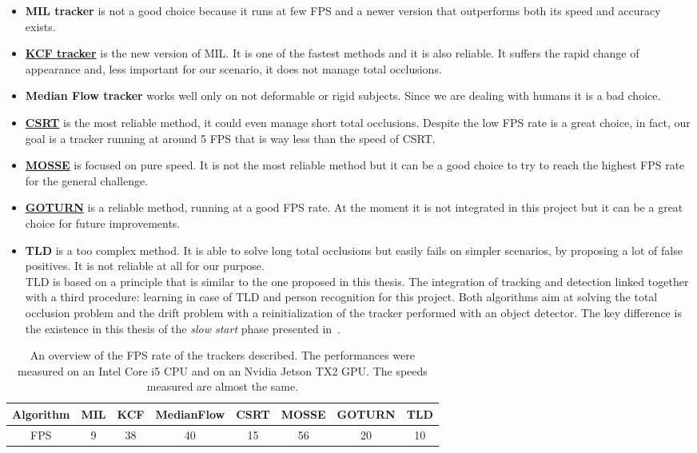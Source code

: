 \begin{itemize}
	\item \textbf{MIL tracker} is not a good choice because it runs at few FPS and a newer version that outperforms both its speed and accuracy exists.
	\item \underline{\textbf{KCF tracker}} is the new version of MIL. It is one of the fastest methods and it is also reliable. It suffers the rapid change of appearance and, less important for our scenario, it does not manage total occlusions.
	\item \textbf{Median Flow tracker} works well only on not deformable or rigid subjects. Since we are dealing with humans it is a bad choice.
	\item \underline{\textbf{CSRT}} is the most reliable method, it could even manage short total occlusions. Despite the low FPS rate is a great choice, in fact, our goal is a tracker running at around 5 FPS that is way less than the speed of CSRT.
	\item \underline{\textbf{MOSSE}} is focused on pure speed. It is not the most reliable method but it can be a good choice to try to reach the highest FPS rate for the general challenge.
	\item \underline{\textbf{GOTURN}} is a reliable method, running at a good FPS rate. At the moment it is not integrated in this project but it can be a great choice for future improvements.
	\item \textbf{TLD} is a too complex method. It is able to solve long total occlusions but easily fails on simpler scenarios, by proposing a lot of false positives. It is not reliable at all for our purpose.\\
	TLD is based on a principle that is similar to the one proposed in this thesis. The integration of tracking and detection linked together with a third procedure: learning in case of TLD and person recognition for this project. Both algorithms aim at solving the total occlusion problem and the drift problem with a reinitialization of the tracker performed with an object detector. The key difference is the existence in this thesis of the \textit{slow start} phase presented in~.
\end{itemize}

\begin{table}[]
	\centering
	\begin{tabular}{|c|c|c|c|c|c|c|c|}
		\hline
		Algorithm & MIL & KCF & MedianFlow & CSRT & MOSSE & GOTURN & TLD \\ \hline
		FPS  & 9   & 38  & 40         & 15   & 56    & 20     & 10  \\ \hline
	\end{tabular}
	\captionsetup{margin=0.5cm}
	\caption[The FPS rates of the tracking algorithms.]{An overview of the FPS rate of the trackers described. The performances were measured on an Intel Core i5 CPU and on an Nvidia Jetson TX2 GPU. The speeds measured are almost the same.}
	\label{tab:trackersFPS}
\end{table}